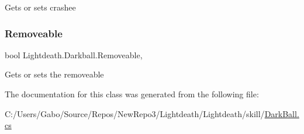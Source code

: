 Gets or sets crashee 

\hypertarget{class_lightdeath_1_1_darkball_af2fa88b2142202c8bc5f3c8cc2f2caa6}{}\label{class_lightdeath_1_1_darkball_af2fa88b2142202c8bc5f3c8cc2f2caa6} 
\subsubsection{\texorpdfstring{Removeable}{Removeable}}
{\footnotesize\ttfamily bool Lightdeath.\+Darkball.\+Removeable\hspace{0.3cm}{\ttfamily [get]}, {\ttfamily [set]}}



Gets or sets the removeable 



The documentation for this class was generated from the following file\+:\begin{DoxyCompactItemize}
\item 
C\+:/\+Users/\+Gabo/\+Source/\+Repos/\+New\+Repo3/\+Lightdeath/\+Lightdeath/skill/\hyperlink{_dark_ball_8cs}{Dark\+Ball.\+cs}\end{DoxyCompactItemize}
